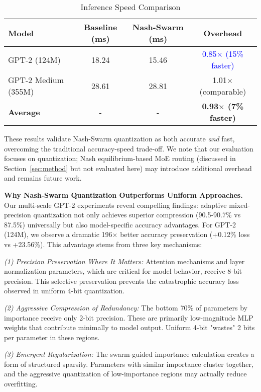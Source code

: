 \documentclass[11pt]{article}
\begin{document}
\begin{table}[h]
\centering
\caption{Inference Speed Comparison}
\label{tab:speed_results}
\begin{tabular}{lccc}
\toprule
\textbf{Model} & \textbf{Baseline (ms)} & \textbf{Nash-Swarm (ms)} & \textbf{Overhead} \\
\midrule
GPT-2 (124M) & 18.24 & 15.46 & \textcolor{blue}{0.85$\times$ (15\% faster)} \\
GPT-2 Medium (355M) & 28.61 & 28.81 & 1.01$\times$ (comparable) \\
\midrule
\textbf{Average} & - & - & \textbf{0.93$\times$ (7\% faster)} \\
\bottomrule
\end{tabular}
\end{table}

These results validate Nash-Swarm quantization as both accurate \textit{and} fast, overcoming the traditional accuracy-speed trade-off. We note that our evaluation focuses on quantization; Nash equilibrium-based MoE routing (discussed in Section~\ref{sec:method} but not evaluated here) may introduce additional overhead and remains future work.

\textbf{Why Nash-Swarm Quantization Outperforms Uniform Approaches.} Our multi-scale GPT-2 experiments reveal compelling findings: adaptive mixed-precision quantization not only achieves superior compression (90.5-90.7\% vs 87.5\%) universally but also model-specific accuracy advantages. For GPT-2 (124M), we observe a dramatic 196$\times$ better accuracy preservation (+0.12\% loss vs +23.56\%). This advantage stems from three key mechanisms:

\textit{(1) Precision Preservation Where It Matters:} Attention mechanisms and layer normalization parameters, which are critical for model behavior, receive 8-bit precision. This selective preservation prevents the catastrophic accuracy loss observed in uniform 4-bit quantization.

\textit{(2) Aggressive Compression of Redundancy:} The bottom 70\% of parameters by importance receive only 2-bit precision. These are primarily low-magnitude MLP weights that contribute minimally to model output. Uniform 4-bit "wastes" 2 bits per parameter in these regions.

\textit{(3) Emergent Regularization:} The swarm-guided importance calculation creates a form of structured sparsity. Parameters with similar importance cluster together, and the aggressive quantization of low-importance regions may actually reduce overfitting.
\end{document}
